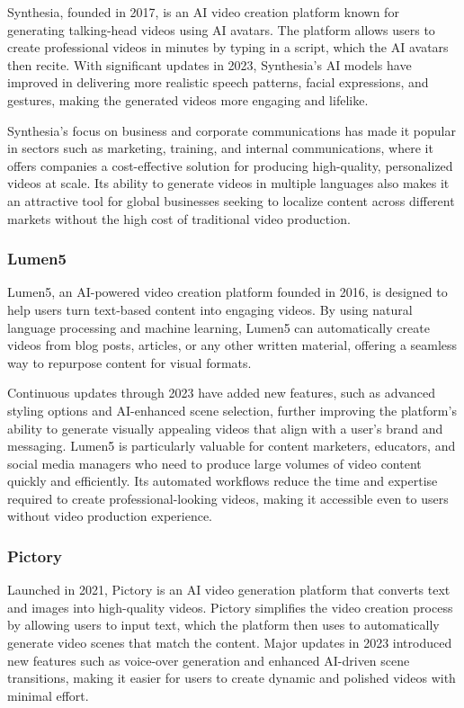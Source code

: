 Synthesia, founded in 2017, is an AI video creation platform known for generating talking-head videos using AI avatars. 
The platform allows users to create professional videos in minutes by typing in a script, which the AI avatars then recite. 
With significant updates in 2023, Synthesia’s AI models have improved in delivering more realistic speech patterns, facial expressions, and gestures, making the generated videos more engaging and lifelike.

Synthesia’s focus on business and corporate communications has made it popular in sectors such as marketing, training, and internal communications, where it offers companies a cost-effective solution for producing high-quality, personalized videos at scale. 
Its ability to generate videos in multiple languages also makes it an attractive tool for global businesses seeking to localize content across different markets without the high cost of traditional video production.

\subsubsection{Lumen5}

Lumen5, an AI-powered video creation platform founded in 2016, is designed to help users turn text-based content into engaging videos. 
By using natural language processing and machine learning, Lumen5 can automatically create videos from blog posts, articles, or any other written material, offering a seamless way to repurpose content for visual formats.

Continuous updates through 2023 have added new features, such as advanced styling options and AI-enhanced scene selection, further improving the platform’s ability to generate visually appealing videos that align with a user’s brand and messaging. 
Lumen5 is particularly valuable for content marketers, educators, and social media managers who need to produce large volumes of video content quickly and efficiently. 
Its automated workflows reduce the time and expertise required to create professional-looking videos, making it accessible even to users without video production experience.

\subsubsection{Pictory}

Launched in 2021, Pictory is an AI video generation platform that converts text and images into high-quality videos. 
Pictory simplifies the video creation process by allowing users to input text, which the platform then uses to automatically generate video scenes that match the content. 
Major updates in 2023 introduced new features such as voice-over generation and enhanced AI-driven scene transitions, making it easier for users to create dynamic and polished videos with minimal effort.

